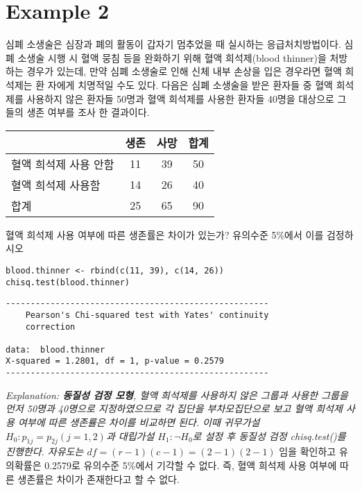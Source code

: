 \documentclass{article}
\begin{document}
\section*{Example 2}
심폐 소생술은 심장과 폐의 활동이 갑자기 멈추었을 때 실시하는 응급처치방법이다.
심폐 소생술 시행 시 혈액 뭉침 등을 완화하기 위해 혈액 희석제(blood thinner)을 처방하는
경우가 있는데, 만약 심폐 소생술로 인해 신체 내부 손상을 입은 경우라면 혈액 희석제는 환
자에게 치명적일 수도 있다. 다음은 심폐 소생술을 받은 환자들 중 혈액 희석제를 사용하지
않은 환자들 50명과 혈액 희석제를 사용한 환자들 40명을 대상으로 그들의 생존 여부를 조사
한 결과이다.
\begin{table}[htb!]
\centering
\begin{tabularx}{0.6\textwidth}{@{\extracolsep{\fill}}lccc}
             & 생존 & 사망 & 합계 \\ \hline
혈액 희석제 사용 안함 & 11 & 39 & 50 \\
혈액 희석제 사용함   & 14 & 26 & 40 \\ \hline
합계           & 25 & 65 & 90
\end{tabularx}
\end{table}
혈액 희석제 사용 여부에 따른 생존률은 차이가 있는가? 유의수준 5\%에서 이를 검정하시오
\begin{lstlisting}[style={r-style}]
blood.thinner <- rbind(c(11, 39), c(14, 26))
chisq.test(blood.thinner)
\end{lstlisting}
\begin{lstlisting}[style={out-style}]
-----------------------------------------------------
	Pearson's Chi-squared test with Yates' continuity
	correction

data:  blood.thinner
X-squared = 1.2801, df = 1, p-value = 0.2579
-----------------------------------------------------
\end{lstlisting}
\emph{Explanation: \textbf{동질성 검정 모형}, 혈액 희석제를 사용하지 않은 그룹과 사용한 그룹을 먼저 50명과 40명으로 지정하였으므로 각 집단을 부차모집단으로 보고 혈액 희석제 사용 여부에 따른 생존률은 차이를 비교하면 된다. 이때 귀무가설 $H_0: p_{1j} = p_{2j} (j=1,2)$과 대립가설 $H_1: \neg H_0$로 설정 후 동질성 검정 chisq.test()를 진행한다. 자유도는 $df=(r-1)(c-1)=(2-1)(2-1)$} 임을 확인하고 유의확률은 0.2579로 유의수준 5\%에서 기각할 수 없다. 즉, 혈액 희석제 사용 여부에 따른 생존률은 차이가 존재한다고 할 수 없다. \\
\end{document}

